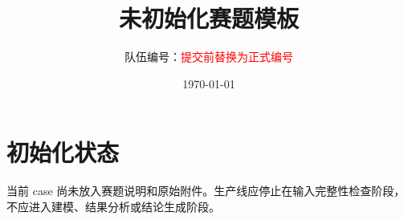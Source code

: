 \documentclass[UTF8,a4paper,12pt,fontset=fandol]{ctexart}
\title{未初始化赛题模板}
\author{队伍编号：\textcolor{red}{提交前替换为正式编号}}
\date{\today}
\begin{document}
\maketitle

\section*{初始化状态}

当前 case 尚未放入赛题说明和原始附件。生产线应停止在输入完整性检查阶段，不应进入建模、结果分析或结论生成阶段。
\end{document}
